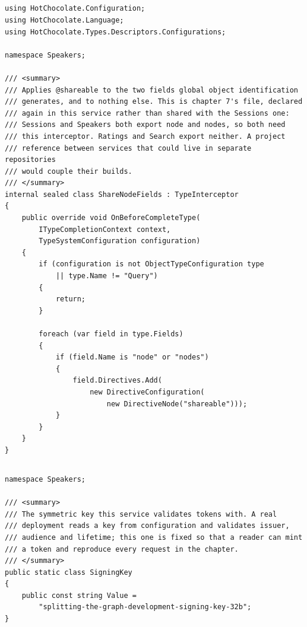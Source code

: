 \subsection*{}
\begin{verbatim}
using HotChocolate.Configuration;
using HotChocolate.Language;
using HotChocolate.Types.Descriptors.Configurations;

namespace Speakers;

/// <summary>
/// Applies @shareable to the two fields global object identification
/// generates, and to nothing else. This is chapter 7's file, declared
/// again in this service rather than shared with the Sessions one:
/// Sessions and Speakers both export node and nodes, so both need
/// this interceptor. Ratings and Search export neither. A project
/// reference between services that could live in separate repositories
/// would couple their builds.
/// </summary>
internal sealed class ShareNodeFields : TypeInterceptor
{
    public override void OnBeforeCompleteType(
        ITypeCompletionContext context,
        TypeSystemConfiguration configuration)
    {
        if (configuration is not ObjectTypeConfiguration type
            || type.Name != "Query")
        {
            return;
        }

        foreach (var field in type.Fields)
        {
            if (field.Name is "node" or "nodes")
            {
                field.Directives.Add(
                    new DirectiveConfiguration(
                        new DirectiveNode("shareable")));
            }
        }
    }
}
\end{verbatim}

\subsection*{}
\begin{verbatim}
namespace Speakers;

/// <summary>
/// The symmetric key this service validates tokens with. A real
/// deployment reads a key from configuration and validates issuer,
/// audience and lifetime; this one is fixed so that a reader can mint
/// a token and reproduce every request in the chapter.
/// </summary>
public static class SigningKey
{
    public const string Value =
        "splitting-the-graph-development-signing-key-32b";
}
\end{verbatim}


